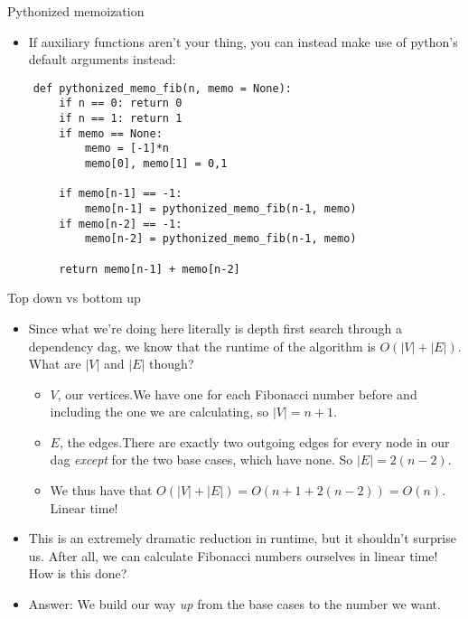 \documentclass{beamer}
\begin{document}
\begin{frame}[fragile]{Pythonized memoization}
    \begin{itemize}
        \item If auxiliary functions aren't your thing, you can instead make use of python's default arguments instead:
    \end{itemize}
    \begin{verbatim}
    def pythonized_memo_fib(n, memo = None):
        if n == 0: return 0
        if n == 1: return 1
        if memo == None:
            memo = [-1]*n
            memo[0], memo[1] = 0,1

        if memo[n-1] == -1:
            memo[n-1] = pythonized_memo_fib(n-1, memo)
        if memo[n-2] == -1:
            memo[n-2] = pythonized_memo_fib(n-1, memo)

        return memo[n-1] + memo[n-2]
    \end{verbatim}
\end{frame}

\begin{frame}{Top down vs bottom up}
    \begin{itemize}
        \item Since what we're doing here literally is depth first search through a dependency dag, we know that the runtime of the algorithm is $O(|V| + |E|)$. What are $|V|$ and $|E|$ though? \pause 
        \begin{itemize}
            \item $V$, our vertices.\pause We have one for each Fibonacci number before and including the one we are calculating, so $|V| = n+1$. \pause 
            \item $E$, the edges.\pause There are exactly two outgoing edges for every node in our dag \emph{except} for the two base cases, which have none. So $|E| = 2(n-2)$. \pause 
            \item We thus have that $O(|V| + |E|) = O(n+1+2(n-2)) = O(n)$. Linear time! \pause 
        \end{itemize}
        \item This is an extremely dramatic reduction in runtime, but it shouldn't surprise us. After all, we can calculate Fibonacci numbers ourselves in linear time! How is this done? \pause 
        \item Answer: We build our way \emph{up} from the base cases to the number we want. 
    \end{itemize}
\end{frame}
\end{document}
